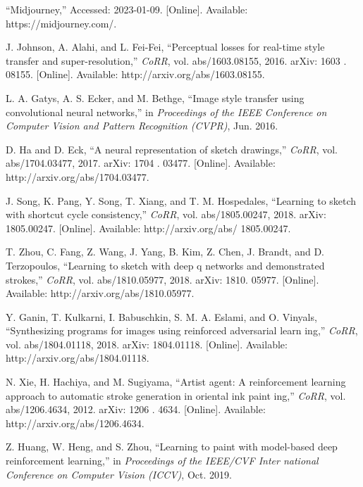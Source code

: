 \documentclass{mva_style}
\begin{document}
\begin{thebibliography}{99}
“Midjourney,” Accessed: 2023-01-09. [Online]. Available: https://midjourney.com/.

\sloppy
J. Johnson, A. Alahi, and L. Fei-Fei, “Perceptual losses for real-time
style transfer and super-resolution,” \textit{CoRR}, vol. abs/1603.08155, 2016.
arXiv: 1603 . 08155. [Online]. Available: http://arxiv.org/abs/1603.08155.

L. A. Gatys, A. S. Ecker, and M. Bethge, “Image style transfer using
convolutional neural networks,” in \textit{Proceedings of the IEEE Conference
on Computer Vision and Pattern Recognition (CVPR)}, Jun. 2016.

\sloppy
D. Ha and D. Eck, “A neural representation of sketch drawings,” \textit{CoRR},
vol. abs/1704.03477, 2017. arXiv: 1704 . 03477. [Online]. Available:
http://arxiv.org/abs/1704.03477.

J. Song, K. Pang, Y. Song, T. Xiang, and T. M. Hospedales, “Learning
to sketch with shortcut cycle consistency,” \textit{CoRR}, vol. abs/1805.00247,
2018. arXiv: 1805.00247. [Online]. Available: http://arxiv.org/abs/
1805.00247.

T. Zhou, C. Fang, Z. Wang, J. Yang, B. Kim, Z. Chen, J. Brandt,
and D. Terzopoulos, “Learning to sketch with deep q networks and
demonstrated strokes,” \textit{CoRR}, vol. abs/1810.05977, 2018. arXiv: 1810.
05977. [Online]. Available: http://arxiv.org/abs/1810.05977.

Y. Ganin, T. Kulkarni, I. Babuschkin, S. M. A. Eslami, and O. Vinyals,
“Synthesizing programs for images using reinforced adversarial learn
ing,” \textit{CoRR}, vol. abs/1804.01118, 2018. arXiv: 1804.01118. [Online].
Available: http://arxiv.org/abs/1804.01118.

N. Xie, H. Hachiya, and M. Sugiyama, “Artist agent: A reinforcement
learning approach to automatic stroke generation in oriental ink paint
ing,” \textit{CoRR}, vol. abs/1206.4634, 2012. arXiv: 1206 . 4634. [Online].
Available: http://arxiv.org/abs/1206.4634.

Z. Huang, W. Heng, and S. Zhou, “Learning to paint with model-based
deep reinforcement learning,” in \textit{Proceedings of the IEEE/CVF Inter
national Conference on Computer Vision (ICCV)}, Oct. 2019.


\end{thebibliography}
\end{document}
